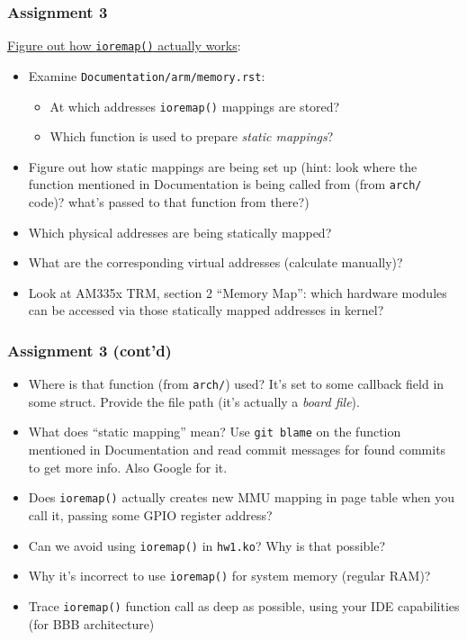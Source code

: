 \begin{frame}
  \frametitle{Assignment 3}
  \underline{Figure out how \texttt{ioremap()} actually works}:
  \begin{itemize}
    \item Examine \texttt{Documentation/arm/memory.rst}:
    \begin{itemize}
      \item At which addresses \texttt{ioremap()} mappings are stored?
      \item Which function is used to prepare \textit{static mappings}?
    \end{itemize}
    \item Figure out how static mappings are being set up (hint: look where
          the function mentioned in Documentation is being called from
          (from \texttt{arch/} code)? what's passed to that function from
          there?)
    \item Which physical addresses are being statically mapped?
    \item What are the corresponding virtual addresses (calculate manually)?
    \item Look at AM335x TRM, section 2 ``Memory Map'': which hardware modules
          can be accessed via those statically mapped addresses in kernel?
  \end{itemize}
\end{frame}

\begin{frame}
  \frametitle{Assignment 3 (cont'd)}
  \begin{itemize}
    \item Where is that function (from \texttt{arch/}) used? It's set to some
          callback field in some struct. Provide the file path (it's actually
          a \textit{board file}).
    \item What does ``static mapping'' mean? Use \texttt{git blame} on the
          function mentioned in Documentation and read commit messages for found
          commits to get more info. Also Google for it.
    \item Does \texttt{ioremap()} actually creates new MMU mapping in page table
          when you call it, passing some GPIO register address?
    \item Can we avoid using \texttt{ioremap()} in \texttt{hw1.ko}? Why is that
          possible?
    \item Why it's incorrect to use \texttt{ioremap()} for system memory
          (regular RAM)?
  \item Trace \texttt{ioremap()} function call as deep as possible, using your
        IDE capabilities (for BBB architecture)
  \end{itemize}
\end{frame}

